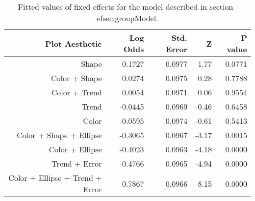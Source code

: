 \begin{table}[ht]
\centering
\begin{tabular}{rrrrr}
  \hline
Plot Aesthetic & Log Odds & Std. Error & Z & P value \\ 
  \hline
Shape & 0.1727 & 0.0977 & 1.77 & 0.0771 \\ 
  Color + Shape & 0.0274 & 0.0975 & 0.28 & 0.7788 \\ 
  Color + Trend & 0.0054 & 0.0971 & 0.06 & 0.9554 \\ 
  Trend & -0.0445 & 0.0969 & -0.46 & 0.6458 \\ 
  Color & -0.0595 & 0.0974 & -0.61 & 0.5413 \\ 
  Color + Shape + Ellipse & -0.3065 & 0.0967 & -3.17 & 0.0015 \\ 
  Color + Ellipse & -0.4023 & 0.0963 & -4.18 & 0.0000 \\ 
  Trend + Error & -0.4766 & 0.0965 & -4.94 & 0.0000 \\ 
  Color + Ellipse + Trend + Error & -0.7867 & 0.0966 & -8.15 & 0.0000 \\ 
   \hline
\end{tabular}
\caption[Fixed effects for cluster target logistic model]{Fitted values of fixed effects for the model described in section~
ef{sec:groupModel}.} 
\label{tab:group.fixef}
\end{table}
